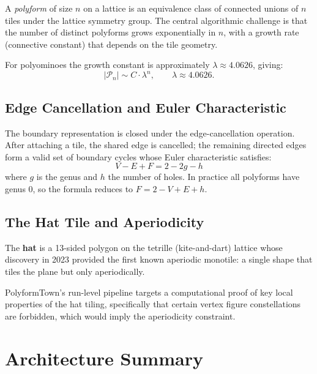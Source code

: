 \documentclass[10pt,a4paper]{article}
\let\polysection\section
\renewcommand\section{\needspace{0.16\textheight}\polysection}
\let\polysubsection\subsection
\renewcommand\subsection{\needspace{0.12\textheight}\polysubsection}
\begin{document}
A \emph{polyform} of size $n$ on a lattice is an equivalence class of
connected unions of $n$ tiles under the lattice symmetry group.  The
central algorithmic challenge is that the number of distinct polyforms
grows exponentially in $n$, with a growth rate (connective constant)
that depends on the tile geometry.

For polyominoes the growth constant is approximately $\lambda \approx
4.0626$, giving:
\[
  |\mathcal{P}_n| \sim C \cdot \lambda^n, \qquad \lambda \approx 4.0626.
\]

\subsection{Edge Cancellation and Euler Characteristic}

The boundary representation is closed under the edge-cancellation
operation.  After attaching a tile, the shared edge is cancelled; the
remaining directed edges form a valid set of boundary cycles whose
Euler characteristic satisfies:
\[
  V - E + F = 2 - 2g - h
\]
where $g$ is the genus and $h$ the number of holes.  In practice all
polyforms have genus 0, so the formula reduces to $F = 2 - V + E + h$.

\subsection{The Hat Tile and Aperiodicity}

The \textbf{hat} is a 13-sided polygon on the tetrille (kite-and-dart)
lattice whose discovery in 2023 provided the first known aperiodic
monotile: a single shape that tiles the plane but only aperiodically.

PolyformTown's run-level pipeline targets a computational proof of
key local properties of the hat tiling, specifically that certain
vertex figure constellations are forbidden, which would imply the
aperiodicity constraint.

\section{Architecture Summary}
\end{document}
